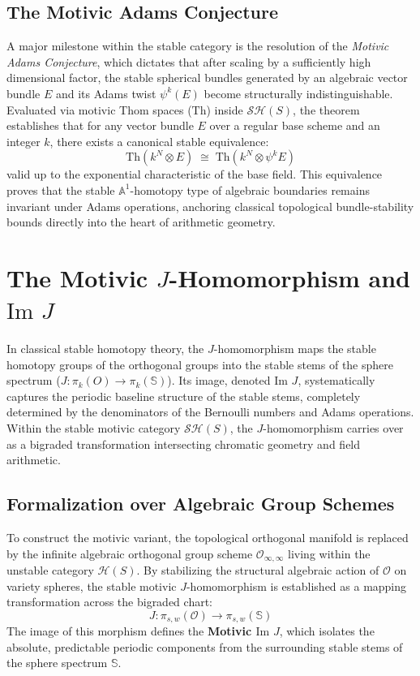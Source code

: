 \documentclass[11pt,oneside]{article}
\begin{document}
\subsection{The Motivic Adams Conjecture}
A major milestone within the stable category is the resolution of the \emph{Motivic Adams Conjecture}, which dictates that after scaling by a sufficiently high dimensional factor, the stable spherical bundles generated by an algebraic vector bundle $E$ and its Adams twist $\psi^k(E)$ become structurally indistinguishable. Evaluated via motivic Thom spaces ($\text{Th}$) inside $\mathcal{S}\mathcal{H}(S)$, the theorem establishes that for any vector bundle $E$ over a regular base scheme and an integer $k$, there exists a canonical stable equivalence:
\[ \text{Th}\left(k^N \otimes E\right) \;\cong\; \text{Th}\left(k^N \otimes \psi^k E\right) \]
valid up to the exponential characteristic of the base field. This equivalence proves that the stable $\mathbb{A}^1$-homotopy type of algebraic boundaries remains invariant under Adams operations, anchoring classical topological bundle-stability bounds directly into the heart of arithmetic geometry.

\section{The Motivic $J$-Homomorphism and $\text{Im } J$}
In classical stable homotopy theory, the $J$-homomorphism maps the stable homotopy groups of the orthogonal groups into the stable stems of the sphere spectrum ($J: \pi_k(O) \to \pi_k(\mathbb{S})$). Its image, denoted $\text{Im } J$, systematically captures the periodic baseline structure of the stable stems, completely determined by the denominators of the Bernoulli numbers and Adams operations. Within the stable motivic category $\mathcal{S}\mathcal{H}(S)$, the $J$-homomorphism carries over as a bigraded transformation intersecting chromatic geometry and field arithmetic.

\subsection{Formalization over Algebraic Group Schemes}
To construct the motivic variant, the topological orthogonal manifold is replaced by the infinite algebraic orthogonal group scheme $\mathcal{O}_{\infty,\infty}$ living within the unstable category $\mathcal{H}(S)$. By stabilizing the structural algebraic action of $\mathcal{O}$ on variety spheres, the stable motivic $J$-homomorphism is established as a mapping transformation across the bigraded chart:
\[ J: \pi_{s,w}(\mathcal{O}) \longrightarrow \pi_{s,w}(\mathbb{S}) \]
The image of this morphism defines the \textbf{Motivic $\text{Im } J$}, which isolates the absolute, predictable periodic components from the surrounding stable stems of the sphere spectrum $\mathbb{S}$.
\end{document}
